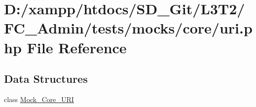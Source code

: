 \hypertarget{_admin_2tests_2mocks_2core_2_u_r_i_8php}{}\section{D\+:/xampp/htdocs/\+S\+D\+\_\+\+Git/\+L3\+T2/\+F\+C\+\_\+\+Admin/tests/mocks/core/uri.php File Reference}
\label{_admin_2tests_2mocks_2core_2_u_r_i_8php}
\subsection*{Data Structures}
\begin{DoxyCompactItemize}
\item 
class \hyperlink{class_mock___core___u_r_i}{Mock\+\_\+\+Core\+\_\+\+U\+R\+I}
\end{DoxyCompactItemize}
